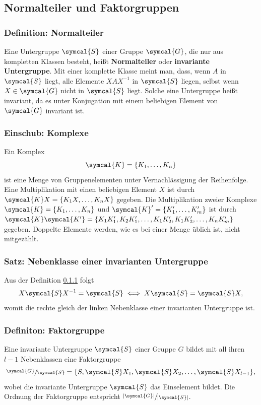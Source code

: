 \documentclass[
  captions=tableheading,  %
  titlepage=firstiscover, %
]{scrartcl}
\begin{document}
\subsection{Normalteiler und Faktorgruppen}
\subsubsection{Definition: Normalteiler}
\label{def:normalteiler}
Eine Untergruppe $\symcal{S}$ einer Gruppe $\symcal{G}$, die nur aus kompletten Klassen besteht,
heißt \textbf{Normalteiler} oder \textbf{invariante Untergruppe}.
Mit einer komplette Klasse meint man, dass, wenn $A$ in  $\symcal{S}$ liegt, alle Elemente $XAX^{-1}$ in $\symcal{S}$ liegen,
selbst wenn $X\in\symcal{G}$ nicht in $\symcal{S}$ liegt.
Solche eine Untergruppe heißt invariant, da es unter Konjugation mit einem beliebigen Element 
von $\symcal{G}$ invariant ist.
\subsubsection{Einschub: Komplexe}
Ein Komplex
\begin{equation*}
  \symcal{K} = \{ K_1, \ldots, K_n \} 
\end{equation*}
ist eine Menge von Gruppenelementen unter Vernachlässigung der Reihenfolge.
Eine Multiplikation mit einen beliebigen Element $X$ ist durch $\symcal{K}X = \{ K_1 X, \ldots, K_n X \}$ gegeben.
Die Multiplikation zweier Komplexe $\symcal{K} = \{ K_1, \ldots, K_n \} $ und $\symcal{K}' =  \{ K_1', \ldots, K_m' \} $ ist durch 
$\symcal{K}\symcal{K'} = \{ K_1 K_1', K_2 K_1', \ldots, K_1 K_2', K_1 K_3', \ldots, K_n K_m'  \} $ gegeben.
Doppelte Elemente werden, wie es bei einer Menge üblich ist, nicht mitgezählt.

\subsubsection{Satz: Nebenklasse einer invarianten Untergruppe}
Aus der Definition \ref{def:normalteiler} folgt
\begin{equation*}
  X\symcal{S}X^{-1} = \symcal{S} \iff X\symcal{S} = \symcal{S}X,
\end{equation*}
womit die rechte gleich der linken Nebenklasse einer invarianten Untergruppe ist.
\subsubsection{Definiton: Faktorgruppe}
Eine invariante Untergruppe $\symcal{S}$ einer Gruppe $G$ bildet mit all ihren $l-1$ Nebenklassen eine Faktorgruppe 
\begin{equation*}
  \sfrac{\symcal{G}}{\symcal{S}} = \{S, \symcal{S}X_1, \symcal{S}X_2, \ldots, \symcal{S}X_{l-1} \},
\end{equation*}
wobei die invariante Untergruppe $\symcal{S}$ das Einselement bildet.
Die Ordnung der Faktorgruppe entspricht $\sfrac{|\symcal{G}|}{|\symcal{S}|}$.
\end{document}
